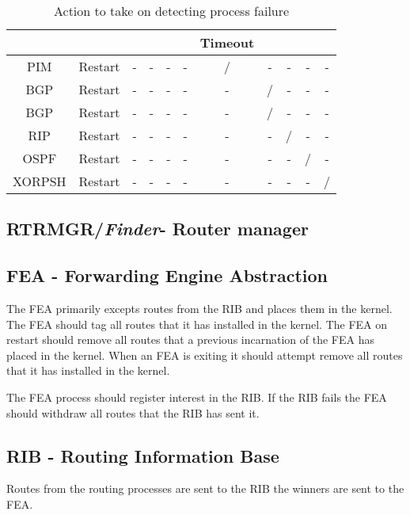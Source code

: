 \documentclass[11pt]{article}
\makeatletter
\newcommand{\finder} {{\em Finder}\@\xspace}
\makeatother
\begin{document}
\begin{table}[ht]
\begin{center}
\begin{tabular}{|c|c|c|c|c|c|c|c|c|c|c|}
              &                &          &      &      &      & Timeout &      &      &      &        \\\hline
PIM           &  Restart       & -        & -    & -    & -    & /       & -    & -    & -    & -      \\\hline
BGP           &  Restart       & -        & -    & -    & -    & -       & /    & -    & -    & -      \\\hline
BGP           &  Restart       & -        & -    & -    & -    & -       & /    & -    & -    & -      \\\hline
RIP           &  Restart       & -        & -    & -    & -    & -       & -    & /    & -    & -      \\\hline
OSPF          &  Restart       & -        & -    & -    & -    & -       & -    & -    & /    & -      \\\hline
XORPSH        &  Restart       & -        & -    & -    & -    & -       & -    & -    & -    & /      \\\hline
\end{tabular}
\end{center}
\caption{\label{stt}Action to take on detecting process failure}
\end{table}


\subsection{RTRMGR/\finder - Router manager}


\subsection{FEA - Forwarding Engine Abstraction}
The FEA primarily excepts routes from the RIB and places them in the
kernel. The FEA should tag all routes that it has installed in the
kernel. The FEA on restart should remove all routes that a previous
incarnation of the FEA has placed in the kernel. When an FEA is
exiting it should attempt remove all routes that it has installed in
the kernel.

The FEA process should register interest in the RIB. If the RIB fails
the FEA should withdraw all routes that the RIB has sent it.

\subsection{RIB - Routing Information Base}
Routes from the routing processes are sent to the RIB the winners are
sent to the FEA.
\end{document}
